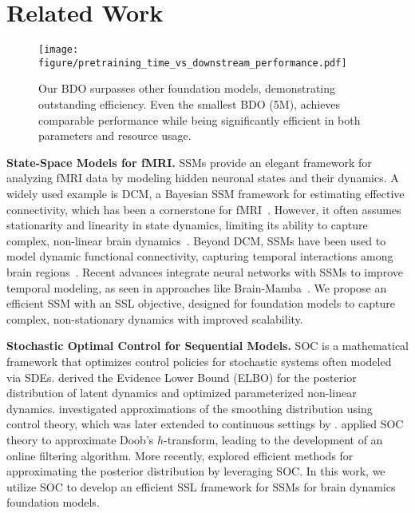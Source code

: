 \section{Related Work}
\label{sec:main:relatedwork}

\begin{figure}
\centering
\texttt{[image: figure/pretraining\_time\_vs\_downstream\_performance.pdf]}
\vspace{-4mm}
\caption{Our BDO surpasses other foundation models, demonstrating outstanding efficiency. Even the smallest BDO (5M), achieves comparable performance while being significantly efficient in both parameters and resource usage.}\label{fig:scalability_gpu}
\vspace{-6mm}
\end{figure}




\textbf{State-Space Models for fMRI. }
SSMs provide an elegant framework for analyzing fMRI data by modeling hidden neuronal states and their dynamics. A widely used example is DCM, a Bayesian SSM framework for estimating effective connectivity, which has been a cornerstone for fMRI~\citep{FRISTON20031273,triantafyllopoulos2021bayesian, novelli2024spectral}. However, it often assumes stationarity and linearity in state dynamics, limiting its ability to capture complex, non-linear brain dynamics~\citep{daunizeau2012stochastic}. Beyond DCM, SSMs have been used to model dynamic functional connectivity, capturing temporal interactions among brain regions~\citep{chakravarty2019state,zhang2021voxel}. Recent advances integrate neural networks with SSMs to improve temporal modeling, as seen in approaches like Brain-Mamba~\citep{behrouz2024brain, wei2024hierarchical}. 
We propose an efficient SSM with an SSL objective, designed for foundation models to capture complex, non-stationary dynamics with improved scalability.

\textbf{Stochastic Optimal Control for Sequential Models. } SOC is a mathematical framework that optimizes control policies for stochastic systems often modeled via SDEs. \citet{li2020scalable} derived the Evidence Lower Bound (ELBO) for the posterior distribution of latent dynamics and optimized parameterized non-linear dynamics. \citet{heng2020controlled} investigated approximations of the smoothing distribution using control theory, which was later extended to continuous settings by \citet{lu2024guidance}. \citet{chopin2023computational} applied SOC theory to approximate Doob's $h$-transform, leading to the development of an online filtering algorithm. More recently, \citet{park2024amortized} explored efficient methods for approximating the posterior distribution by leveraging SOC. In this work, we utilize SOC to develop an efficient SSL framework for SSMs for brain dynamics foundation models.











